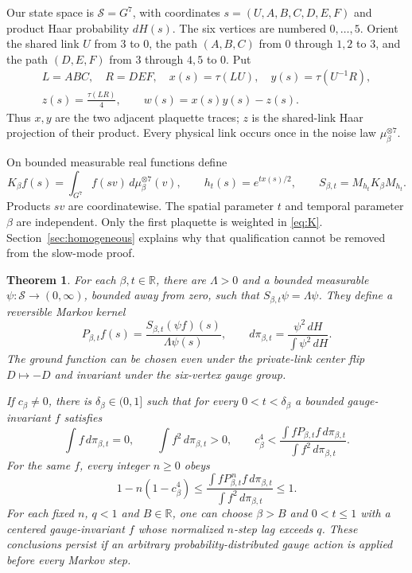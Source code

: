 \documentclass[11pt]{article}
\newtheorem{theorem}{Theorem}[section]
\newcommand{\R}{\mathbb R}\newcommand{\E}{\mathbb E}
\begin{document}
Our state space is $\mathcal S=G^7$, with coordinates
$s=(U,A,B,C,D,E,F)$ and product Haar probability $dH(s)$. The six
vertices are numbered $0,\ldots,5$. Orient the shared link $U$ from
$3$ to $0$, the path $(A,B,C)$ from $0$ through $1,2$ to $3$, and
the path $(D,E,F)$ from $3$ through $4,5$ to $0$. Put
\begin{equation}\label{eq:words}
 \begin{gathered}
 L=ABC,\quad R=DEF,\quad x(s)=\tau(LU),\quad y(s)=\tau(U^{-1}R),\\
 z(s)=\frac{\tau(LR)}4,\qquad w(s)=x(s)y(s)-z(s).
 \end{gathered}
\end{equation}
Thus $x,y$ are the two adjacent plaquette traces; $z$ is the shared-link
Haar projection of their product. Every physical link occurs once in
the noise law $\mu_\beta^{\otimes7}$.

On bounded measurable real functions define
\begin{equation}\label{eq:K}
 K_\beta f(s)=\int_{G^7}f(sv)\,d\mu_\beta^{\otimes7}(v),\qquad
 h_t(s)=e^{t x(s)/2},\qquad S_{\beta,t}=M_{h_t}K_\beta M_{h_t}.
\end{equation}
Products $sv$ are coordinatewise. The spatial parameter $t$ and temporal
parameter $\beta$ are independent. Only the first plaquette is weighted
in \eqref{eq:K}. Section~\ref{sec:homogeneous} explains why that
qualification cannot be removed from the slow-mode proof.

\begin{theorem}\label{thm:main}
For each $\beta,t\in\R$, there are $\Lambda>0$ and a bounded measurable
$\psi:\mathcal S\to(0,\infty)$, bounded away from zero, such that
$S_{\beta,t}\psi=\Lambda\psi$. They define a reversible Markov kernel
\begin{equation}\label{eq:P}
 P_{\beta,t}f(s)=\frac{S_{\beta,t}(\psi f)(s)}{\Lambda\psi(s)},
 \qquad d\pi_{\beta,t}=\frac{\psi^2\,dH}{\int\psi^2\,dH}.
\end{equation}
The ground function can be chosen even under the private-link center
flip $D\mapsto-D$ and invariant under the six-vertex gauge group.

If $c_\beta\ne0$, there is $\delta_\beta\in(0,1]$ such that for every
$0<t<\delta_\beta$ a bounded gauge-invariant $f$ satisfies
\begin{equation}\label{eq:mainlag}
 \int f\,d\pi_{\beta,t}=0,\qquad \int f^2\,d\pi_{\beta,t}>0,
 \qquad c_\beta^4<
 \frac{\int fP_{\beta,t}f\,d\pi_{\beta,t}}{\int f^2\,d\pi_{\beta,t}}.
\end{equation}
For the same $f$, every integer $n\geq0$ obeys
\begin{equation}\label{eq:lagiter}
 1-n(1-c_\beta^4)\leq
 \frac{\int fP_{\beta,t}^{\,n}f\,d\pi_{\beta,t}}{\int f^2\,d\pi_{\beta,t}}
 \leq1.
\end{equation}
For each fixed $n$, $q<1$ and $B\in\R$, one can choose
$\beta>B$ and $0<t\leq1$ with a centered gauge-invariant $f$ whose
normalized $n$-step lag exceeds $q$. These conclusions persist if an
arbitrary probability-distributed gauge action is applied before every
Markov step.
\end{theorem}
\end{document}
